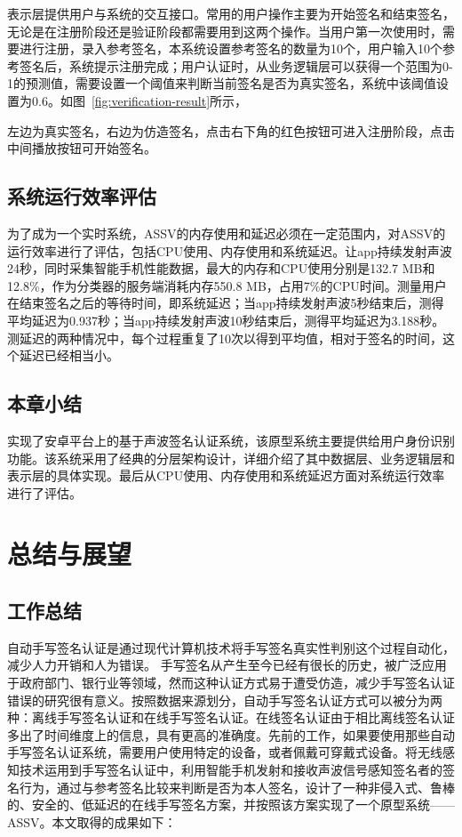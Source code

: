 表示层提供用户与系统的交互接口。常用的用户操作主要为开始签名和结束签名，无论是在注册阶段还是验证阶段都需要用到这两个操作。当用户第一次使用时，需要进行注册，录入参考签名，本系统设置参考签名的数量为10个，用户输入10个参考签名后，系统提示注册完成；用户认证时，从业务逻辑层可以获得一个范围为0-1的预测值，需要设置一个阈值来判断当前签名是否为真实签名，系统中该阈值设置为0.6。如图~\ref{fig:verification-result}所示，

左边为真实签名，右边为仿造签名，点击右下角的红色按钮可进入注册阶段，点击中间播放按钮可开始签名。


\section{系统运行效率评估}
为了成为一个实时系统，ASSV的内存使用和延迟必须在一定范围内，对ASSV的运行效率进行了评估，包括CPU使用、内存使用和系统延迟。让app持续发射声波24秒，同时采集智能手机性能数据，最大的内存和CPU使用分别是132.7 MB和12.8\%，作为分类器的服务端消耗内存550.8 MB，占用7\%的CPU时间。测量用户在结束签名之后的等待时间，即系统延迟；当app持续发射声波5秒结束后，测得平均延迟为0.937秒；当app持续发射声波10秒结束后，测得平均延迟为3.188秒。测延迟的两种情况中，每个过程重复了10次以得到平均值，相对于签名的时间，这个延迟已经相当小。

\section{本章小结}
实现了安卓平台上的基于声波签名认证系统，该原型系统主要提供给用户身份识别功能。该系统采用了经典的分层架构设计，详细介绍了其中数据层、业务逻辑层和表示层的具体实现。最后从CPU使用、内存使用和系统延迟方面对系统运行效率进行了评估。

\chapter{总结与展望}

\section{工作总结}

自动手写签名认证是通过现代计算机技术将手写签名真实性判别这个过程自动化，减少人力开销和人为错误。 手写签名从产生至今已经有很长的历史，被广泛应用于政府部门、银行业等领域，然而这种认证方式易于遭受仿造，减少手写签名认证错误的研究很有意义。按照数据来源划分，自动手写签名认证方式可以被分为两种：离线手写签名认证和在线手写签名认证。在线签名认证由于相比离线签名认证多出了时间维度上的信息，具有更高的准确度。先前的工作，如果要使用那些自动手写签名认证系统，需要用户使用特定的设备，或者佩戴可穿戴式设备。将无线感知技术运用到手写签名认证中，利用智能手机发射和接收声波信号感知签名者的签名行为，通过与参考签名比较来判断是否为本人签名，设计了一种非侵入式、鲁棒的、安全的、低延迟的在线手写签名方案，并按照该方案实现了一个原型系统——ASSV。本文取得的成果如下：


